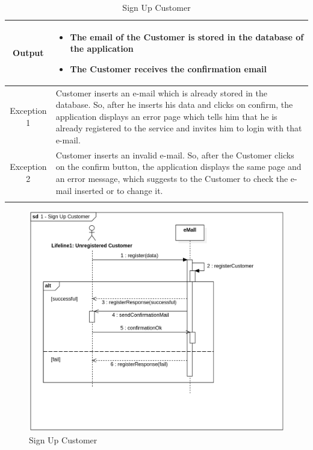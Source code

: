 \begin{longtable}{ | c | p{10cm} | }
    Output           & \begin{itemize}
        \item The email of the Customer is stored in the database of the application
        \item The Customer receives the confirmation email
    \end{itemize} \\
    \hline
    \hline
    Exception 1      & Customer inserts an e-mail which is already stored in the database. So, after he inserts his data and clicks on confirm, the application displays an error page which tells him that he is already registered to the service and invites him to login with that e-mail. \\
    \hline
    Exception 2      & Customer inserts an invalid e-mail. So, after the Customer clicks on the confirm button, the application displays the same page and an error message, which suggests to the Customer to check the e-mail inserted or to change it. \\
    \hline
    \caption{Sign Up Customer} \\
\end{longtable}
\begin{figure}[H]
    \begin{center}
        \includegraphics[width=\textwidth]{img/sequence/sign-up.png}
        \caption{Sign Up Customer}
    \end{center}
\end{figure}
